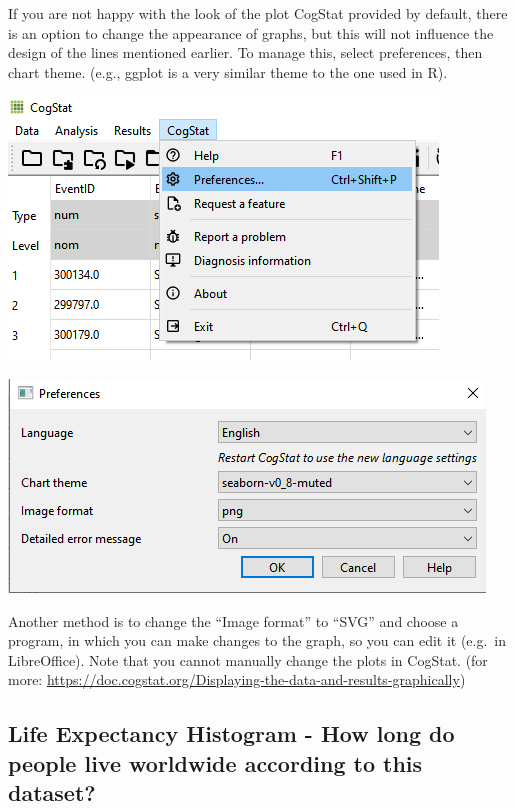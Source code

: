 \documentclass[
]{book}
\begin{document}
If you are not happy with the look of the plot CogStat provided by default, there is an option to change the appearance of graphs, but this will not influence the design of the lines mentioned earlier. To manage this, select preferences, then chart theme. (e.g., ggplot is a very similar theme to the one used in R).

\includegraphics{img/ch1/preferences2.png}

\includegraphics{img/ch1/preferences_charttheme.png}

Another method is to change the ``Image format'' to ``SVG'' and choose a program, in which you can make changes to the graph, so you can edit it (e.g.~in LibreOffice). Note that you cannot manually change the plots in CogStat. (for more: \url{https://doc.cogstat.org/Displaying-the-data-and-results-graphically})

\hypertarget{life-expectancy-histogram---how-long-do-people-live-worldwide-according-to-this-dataset}{%
\subsection{Life Expectancy Histogram - How long do people live worldwide according to this dataset?}\label{life-expectancy-histogram---how-long-do-people-live-worldwide-according-to-this-dataset}}
\end{document}
